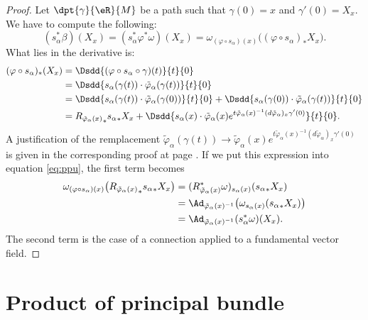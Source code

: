 \begin{proof}
	Let $\dpt{\gamma}{\eR}{M}$ be a path such that $\gamma(0)=x$ and $\gamma'(0)=X_x$. We have to compute the following:
	\begin{equation}\label{eq:ppu}
		(s_{\alpha}^*\beta)(X_x)=(s_{\alpha}^*\varphi^*\omega)(X_x)=\omega_{(\varphi\circ s_{\alpha})(x)}\big(  (\varphi\circ s_{\alpha})_*X_x  \big).
	\end{equation}
	What lies in the derivative is:
	\begin{equation}
		\begin{split}
			(\varphi\circ s_{\alpha})_*(X_x)&=\Dsdd{ (\varphi\circ s_{\alpha}\circ\gamma)(t) }{t}{0}\\
			&=\Dsdd{  s_{\alpha}(\gamma(t))\cdot\tilde{\varphi}_{\alpha}(\gamma(t))  }{t}{0}\\
			&=\Dsdd{ s_{\alpha}(\gamma(t))\cdot\tilde{\varphi}_{\alpha}(\gamma(0)) }{t}{0}
			+\Dsdd{ s_{\alpha}(\gamma(0))\cdot\tilde{\varphi}_{\alpha}(\gamma(t)) }{t}{0}\\
			&={R_{\tilde{\varphi}_{\alpha}(x)}}_*{s_{\alpha}}_*X_x
			+\Dsdd{  s_{\alpha}(x)\cdot\tilde{\varphi}_{\alpha}(x)e^{ t\tilde{\varphi}_{\alpha}(x)^{-1}(d\tilde{\varphi}_{\alpha})_x\gamma'(0)}}{t}{0}.
		\end{split}
	\end{equation}
	A justification of the remplacement $\tilde{\varphi}_{\alpha}(\gamma(t))\to \tilde{\varphi}_{\alpha}(x)e^{t\tilde{\varphi}_{\alpha}(x)^{-1}(d\tilde{\varphi}_{\alpha})_x\gamma'(0)}$ is given in the corresponding proof at page \pageref{pg:justif_s}.
	If we put this expression into equation \eqref{eq:ppu}, the first term becomes
	\[
		\begin{split}
			\omega_{(\varphi\circ s_{\alpha})(x)}\big(  {{R_{\tilde{\varphi}_{\alpha}(x)}}_*{s_{\alpha}}_*X_x}   \big)
			&=(R^*_{\tilde{\varphi}_{\alpha}(x)}\omega)_{s_{\alpha}(x)}({s_{\alpha}}_*X_x)\\
			&=\Ad_{\tilde{\varphi}_{\alpha}(x)^{-1}} \big(\omega_{s_{\alpha}(x)} ( {s_{\alpha}}_*X_x ) \big)\\
			&=\Ad_{\tilde{\varphi}_{\alpha}(x)^{-1}}  (s_{\alpha}^*\omega)(X_x).
		\end{split}
	\]
	The second term is the case of a connection applied to a fundamental vector field.

\end{proof}

\section{Product of principal bundle}\label{sec:produit_bundle}

